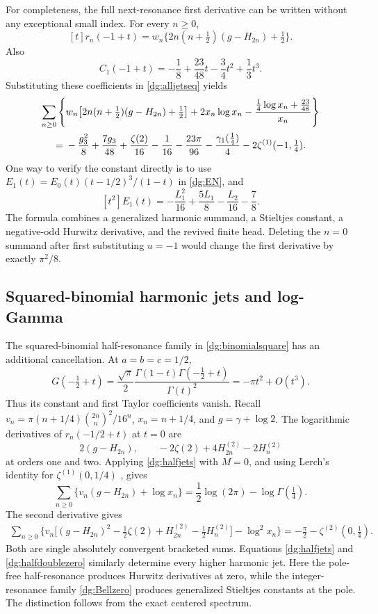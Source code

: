 \documentclass[11pt,a4paper]{article}
\numberwithin{equation}{section}
\theoremstyle{definition}
\theoremstyle{remark}
\begin{document}
For completeness, the full next-resonance first derivative can be
written without any exceptional small index. For every $n\ge0$,
\[
 [t]r_n(-1+t)=w_n\{2n(n+\tfrac12)(g-H_{2n})+\tfrac12\}.
\]
Also
\[
 C_1(-1+t)=-\frac18+\frac{23}{48}t-\frac34t^2+\frac13t^3.
\]
Substituting these coefficients in \eqref{dg:alljetseq} yields
\begin{align}
 \sum_{n\ge0}\Bigg\{&
 w_n\big[2n(n+\tfrac12)(g-H_{2n})+\tfrac12\big]
 +2x_n\log x_n
 -\frac{\tfrac14\log x_n+\tfrac{23}{48}}{x_n}\Bigg\}
 \notag\\
 ={}&-\frac{g_3^2}{8}+\frac{7g_3}{48}+\frac{\zeta(2)}{16}
 -\frac1{16}-\frac{23\pi}{96}
 -\frac{\gamma_1(\tfrac14)}4-2\zeta^{(1)}(-1,\tfrac14).
 \label{dg:quarticN1jet}
\end{align}
One way to verify the constant directly is to use
$E_1(t)=E_0(t)(t-1/2)^3/(1-t)$ in \eqref{dg:EN}, and
\[
 [t^2]E_1(t)=-\frac{L_1^2}{16}
                +\frac{5L_1}{8}-\frac{L_2}{16}-\frac78.
\]
The formula combines a generalized harmonic summand, a Stieltjes
constant, a negative-odd Hurwitz derivative, and the revived finite
head. Deleting the $n=0$ summand after first substituting $u=-1$
would change the first derivative by exactly $\pi^2/8$.

\subsection{Squared-binomial harmonic jets and log-Gamma}
The squared-binomial half-resonance family in
\eqref{dg:binomialsquare} has an additional cancellation. At
$a=b=c=1/2$,
\begin{equation}\label{dg:halfdoublezero}
 G(-\tfrac12+t)=\frac{\sqrt\pi}{2}
       \frac{\Gamma(1-t)\Gamma(-\tfrac12+t)}{\Gamma(t)^2}
       =-\pi t^2+O(t^3).
\end{equation}
Thus its constant and first Taylor coefficients vanish. Recall
$v_n=\pi(n+1/4)\binom{2n}{n}^2/16^n$, $x_n=n+1/4$, and
$g=\gamma+\log2$. The logarithmic derivatives of
$r_n(-1/2+t)$ at $t=0$ are
\[
 2(g-H_{2n}),\qquad
 -2\zeta(2)+4H_{2n}^{(2)}-2H_n^{(2)}
\]
at orders one and two. Applying \eqref{dg:halfjets} with $M=0$,
and using Lerch's identity for $\zeta^{(1)}(0,1/4)$
\cite[Eq.~25.11.18]{dlmf-hurwitz}, gives
\begin{equation}\label{dg:squaredharmonic1}
 \boxed{\sum_{n\ge0}\{v_n(g-H_{2n})+\log x_n\}
 =\frac12\log(2\pi)-\log\Gamma(\tfrac14).}
\end{equation}
The second derivative gives
\begin{align}
 \sum_{n\ge0}\Big\{v_n\big[(g-H_{2n})^2
       -\tfrac12\zeta(2)+H_{2n}^{(2)}-\tfrac12H_n^{(2)}\big]
                         -\log^2x_n\Big\}
 =-\frac\pi2-\zeta^{(2)}(0,\tfrac14).
 \label{dg:squaredharmonic2}
\end{align}
Both are single absolutely convergent bracketed sums. Equations
\eqref{dg:halfjets} and \eqref{dg:halfdoublezero} similarly determine
every higher harmonic jet. Here the pole-free half-resonance produces
Hurwitz derivatives at zero, while the integer-resonance family
\eqref{dg:Bellzero} produces generalized Stieltjes constants at the
pole. The distinction follows from the exact centered spectrum.
\end{document}
